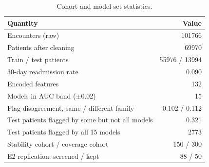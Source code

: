 \begin{table}[t]
\centering
\caption{Cohort and model-set statistics.}
\label{tab:data}
\footnotesize
\setlength{\tabcolsep}{3pt}
\begin{tabular}{lr}
\toprule
Quantity & Value \\
\midrule
Encounters (raw) & 101766 \\
Patients after cleaning & 69970 \\
Train / test patients & 55976 / 13994 \\
30-day readmission rate & 0.090 \\
Encoded features & 132 \\
Models in AUC band ($\pm$0.02) & 15 \\
Flag disagreement, same / different family & 0.102 / 0.112 \\
Test patients flagged by some but not all models & 0.321 \\
Test patients flagged by all 15 models & 2773 \\
Stability cohort / coverage cohort & 150 / 300 \\
E2 replication: screened / kept & 88 / 50 \\
\bottomrule
\end{tabular}
\end{table}
